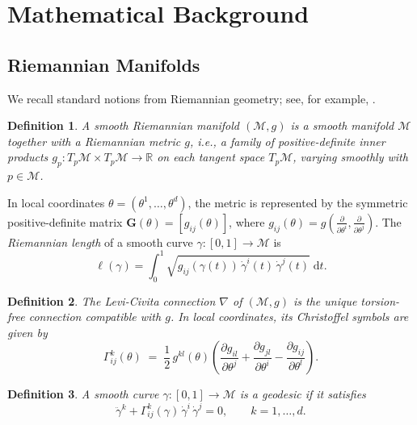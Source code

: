 \documentclass[a4paper,fleqn]{cas-dc}
\newtheorem{definition}{Definition}
\newcommand{\R}{\mathbb{R}}
\newcommand{\calM}{\mathcal{M}}
\newcommand{\Gmat}{\mathbf{G}}
\newcommand{\gij}{g_{ij}}
\newcommand{\Gammaijk}{\Gamma_{ij}^{k}}
\begin{document}
\section{Mathematical Background}
\label{sec:background}

\subsection{Riemannian Manifolds}

We recall standard notions from Riemannian geometry; see, for example,
\cite{petersen2016riemannian,do2002riemannian,lee2006riemannian}.

\begin{definition}%
  \label{def:riemannian_manifold}
  A \emph{smooth Riemannian manifold} $(\calM, g)$ is a smooth manifold
  $\calM$ together with a \emph{Riemannian metric} $g$, i.e., a family of
  positive-definite inner products
  $g_p : T_p\calM \times T_p\calM \to \R$ on each tangent space $T_p\calM$,
  varying smoothly with $p \in \calM$.
\end{definition}

In local coordinates $\theta = (\theta^1,\ldots,\theta^d)$, the metric is
represented by the symmetric positive-definite matrix
$\Gmat(\theta) = [g_{ij}(\theta)]$, where
$g_{ij}(\theta) = g\!\left(\tfrac{\partial}{\partial\theta^i},
\tfrac{\partial}{\partial\theta^j}\right)$.
The \emph{Riemannian length} of a smooth curve
$\gamma: [0,1] \to \calM$ is
\[
\ell(\gamma)
=
\int_0^1
\sqrt{\gij(\gamma(t))\,\dot\gamma^i(t)\,\dot\gamma^j(t)}
\;\mathrm{d}t .
\]

\begin{definition}%
  \label{def:levi_civita}
  The \emph{Levi-Civita connection} $\nabla$ of $(\calM,g)$ is the unique
  torsion-free connection compatible with $g$.
  In local coordinates, its Christoffel symbols are given by
  \begin{equation}
    \Gammaijk(\theta) \;=\; \frac{1}{2}\,g^{kl}(\theta)
    \left(\frac{\partial g_{il}}{\partial\theta^j}
         +\frac{\partial g_{jl}}{\partial\theta^i}
         -\frac{\partial g_{ij}}{\partial\theta^l}\right).
    \label{eq:christoffel}
  \end{equation}
\end{definition}

\begin{definition}%
  \label{def:geodesic}
  A smooth curve $\gamma:[0,1]\to\calM$ is a \emph{geodesic} if it satisfies
  \begin{equation}
    \ddot\gamma^k
    + \Gammaijk(\gamma)\,\dot\gamma^i\,\dot\gamma^j
    = 0,
    \qquad k=1,\ldots,d .
    \label{eq:geodesic}
  \end{equation}
\end{definition}
\end{document}

